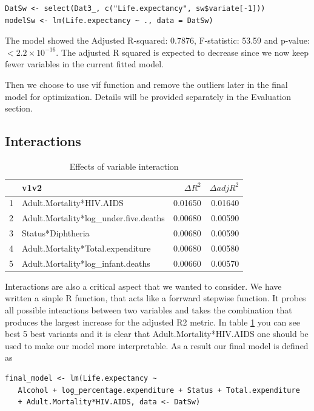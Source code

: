 \begin{verbatim}
DatSw <- select(Dat3_, c("Life.expectancy", sw$variate[-1]))
modelSw <- lm(Life.expectancy ~ ., data = DatSw)
\end{verbatim}

The model showed the Adjusted R-squared:  0.7876, F-statistic: 53.59 and p-value: $< 2.2\times 10^{-16}$. The adjusted R squared is expected to decrease since we now keep fewer variables in the current fitted model.

Then we choose to use vif function and remove the outliers later in the final model for optimization. Details will be provided separately in the Evaluation section. 

\subsection{Interactions}

\begin{table}[ht]
\centering
\begin{tabular}{rlrr}
  \hline
 & v1v2 & $\Delta R^2$ & $\Delta adjR^2$ \\ 
  \hline
1 & Adult.Mortality*HIV.AIDS & 0.01650 & 0.01640 \\ 
  2 & Adult.Mortality*log\_under.five.deaths & 0.00680 & 0.00590 \\ 
  3 & Status*Diphtheria & 0.00680 & 0.00590 \\ 
  4 & Adult.Mortality*Total.expenditure & 0.00680 & 0.00580 \\ 
  5 & Adult.Mortality*log\_infant.deaths & 0.00660 & 0.00570 \\ 
   \hline
\end{tabular}
\caption{Effects of variable interaction} 
\label{tab:int}
\end{table}

Interactions are also a critical aspect that we wanted to consider. We have written a sinple R function, that acts like a forrward stepwise function. It probes all possible inteactions between two variables and takes the combination that produces the largest increase for the adjusted R2 metric. In table \ref{tab:int} you can see best 5 best variants and it is clear that  Adult.Mortality*HIV.AIDS one should be used to make our model more interpretable. As a result our final model is defined as
\begin{verbatim}
final_model <- lm(Life.expectancy ~ 
   Alcohol + log_percentage.expenditure + Status + Total.expenditure 
   + Adult.Mortality*HIV.AIDS, data <- DatSw)
\end{verbatim}

